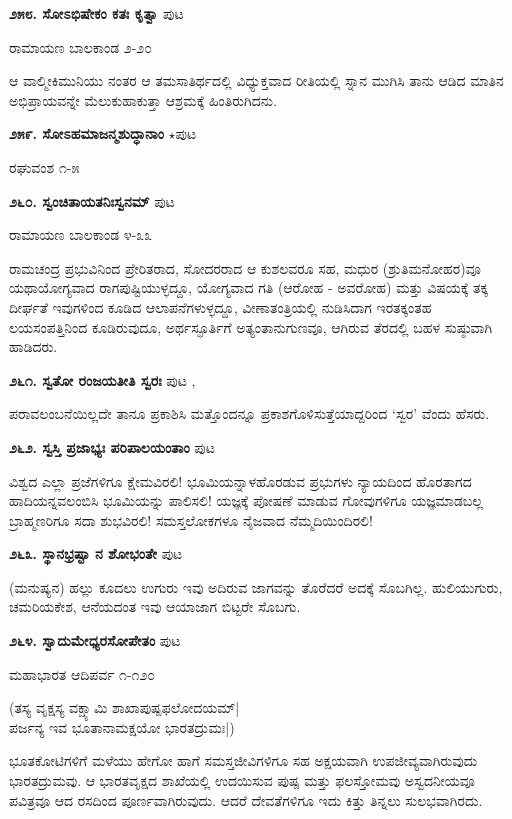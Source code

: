 {\medskip
\noindent\textbf{೨೫೮. ಸೋಽಭಿಷೇಕಂ ಕತಃ ಕೃತ್ವಾ} \hfill ಪುಟ \pageref{201}

\hfill ರಾಮಾಯಣ ಬಾಲಕಾಂಡ ೨-೨೦

ಆ ವಾಲ್ಮೀಕಿಮುನಿಯು ನಂತರ ಆ ತಮಸಾತಿರ್ಥದಲ್ಲಿ ವಿಧ್ಯುಕ್ತವಾದ ರೀತಿಯಲ್ಲಿ ಸ್ನಾನ ಮುಗಿಸಿ ತಾನು ಆಡಿದ ಮಾತಿನ ಅಭಿಪ್ರಾಯವನ್ನೇ ಮೆಲುಕುಹಾಕುತ್ತಾ ಆಶ್ರಮಕ್ಕೆ ಹಿಂತಿರುಗಿದನು.

\medskip
\noindent\textbf{೨೫೯. ಸೋಽಹಮಾಜನ್ಮಶುದ್ಧಾನಾಂ} $\star$\hfill ಪುಟ \pageref{148}

\hfill ರಘುವಂಶ ೧-೫

\medskip
\noindent\textbf{೨೬೦. ಸ್ವಂಚಿತಾಯತನಿಃಸ್ವನಮ್} \hfill ಪುಟ \pageref{250}

\hfill ರಾಮಾಯಣ ಬಾಲಕಾಂಡ ೪-೩೩

ರಾಮಚಂದ್ರ ಪ್ರಭುವಿನಿಂದ ಪ್ರೇರಿತರಾದ, ಸೋದರರಾದ ಆ ಕುಶಲವರೂ ಸಹ, ಮಧುರ (ಶ್ರುತಿಮನೋಹರ)ವೂ ಯಥಾಯೋಗ್ಯವಾದ ರಾಗಪುಷ್ಟಿಯುಳ್ಳದ್ದೂ, ಯೋಗ್ಯವಾದ ಗತಿ (ಆರೋಹ - ಅವರೋಹ) ಮತ್ತು ವಿಷಯಕ್ಕೆ ತಕ್ಕ ದೀರ್ಘತೆ ಇವುಗಳಿಂದ ಕೂಡಿದ ಆಲಾಪನೆಗಳುಳ್ಳದ್ದೂ, ವೀಣಾತಂತ್ರಿಯಲ್ಲಿ ನುಡಿಸಿದಾಗ ಇರತಕ್ಕಂತಹ ಲಯಸಂಪತ್ತಿನಿಂದ ಕೂಡಿರುವುದೂ, ಅರ್ಥಸ್ಫೂರ್ತಿಗೆ ಅತ್ಯಂತಾನುಗುಣವೂ, ಆಗಿರುವ ತೆರದಲ್ಲಿ ಬಹಳ ಸುಷ್ಠುವಾಗಿ ಹಾಡಿದರು.

\medskip
\noindent\textbf{೨೬೧. ಸ್ವತೋ ರಂಜಯತೀತಿ ಸ್ವರಃ} \hfill ಪುಟ \pageref{11},\pageref{17}

\hfill ಪರಾವಲಂಬನೆಯಿಲ್ಲದೇ ತಾನೂ ಪ್ರಕಾಶಿಸಿ ಮತ್ತೊಂದನ್ನೂ ಪ್ರಕಾಶಗೊಳಿಸುತ್ತೆಯಾದ್ದರಿಂದ `ಸ್ವರ' ವೆಂದು ಹೆಸರು.

\medskip
\noindent\textbf{೨೬೨. ಸ್ವಸ್ತಿ ಪ್ರಜಾಭ್ಯಃ ಪರಿಪಾಲಯಂತಾಂ} \hfill ಪುಟ \pageref{149}

\hfill ವಿಶ್ವದ ಎಲ್ಲಾ ಪ್ರಜೆಗಳಿಗೂ ಕ್ಷೇಮವಿರಲಿ! ಭೂಮಿಯನ್ನಾಳಹೊರಡುವ ಪ್ರಭುಗಳು ನ್ಯಾಯದಿಂದ ಹೊರತಾಗದ ಹಾದಿಯನ್ನವಲಂಬಿಸಿ ಭೂಮಿಯನ್ನು ಪಾಲಿಸಲಿ! ಯಜ್ಞಕ್ಕೆ ಪೋಷಣೆ ಮಾಡುವ ಗೋವುಗಳಿಗೂ ಯಜ್ಞಮಾಡಬಲ್ಲ ಬ್ರಾಹ್ಮಣರಿಗೂ ಸದಾ ಶುಭವಿರಲಿ! ಸಮಸ್ತಲೋಕಗಳೂ ನೈಜವಾದ ನೆಮ್ಮದಿಯಿಂದಿರಲಿ!

\medskip
\noindent\textbf{೨೬೩. ಸ್ಥಾನಭ್ರಷ್ಟಾ ನ ಶೋಭಂತೇ} \hfill ಪುಟ \pageref{48}

\hfill (ಮನುಷ್ಯನ) ಹಲ್ಲು ಕೂದಲು ಉಗುರು ಇವು ಅದಿರುವ ಜಾಗವನ್ನು ತೊರೆದರೆ ಅದಕ್ಕೆ ಸೊಬಗಿಲ್ಲ. ಹುಲಿಯುಗುರು, ಚಮರಿಯಕೇಶ, ಆನೆಯದಂತ ಇವು ಆಯಾಜಾಗ ಬಿಟ್ಟರೇ ಸೊಬಗು.

\medskip
\noindent\textbf{೨೬೪. ಸ್ವಾದುಮೇಧ್ಯರಸೋಪೇತಂ} \hfill ಪುಟ \pageref{119}

\hfill ಮಹಾಭಾರತ ಆದಿಪರ್ವ ೧-೧೨೦

\begin{shloka}
(ತಸ್ಯ ವೃಕ್ಷಸ್ಯ ವಕ್ಷ್ಯಾಮಿ ಶಾಖಾಪುಷ್ಪಫಲೋದಯಮ್|\\
ಪರ್ಜನ್ಯ ಇವ ಭೂತಾನಾಮಕ್ಷಯೋ ಭಾರತದ್ರುಮಃ|)
\end{shloka}

ಭೂತಕೋಟಿಗಳಿಗೆ ಮಳೆಯು ಹೇಗೋ ಹಾಗೆ ಸಮಸ್ತಜೀವಿಗಳಿಗೂ ಸಹ ಅಕ್ಷಯವಾಗಿ ಉಪಜೀವ್ಯವಾಗಿರುವುದು ಭಾರತದ್ರುಮವು. ಆ ಭಾರತವೃಕ್ಷದ ಶಾಖೆಯಲ್ಲಿ ಉದಯಿಸುವ ಪುಷ್ಪ ಮತ್ತು ಫಲಸ್ತೋಮವು ಅಸ್ವದನೀಯವೂ ಪವಿತ್ರವೂ ಆದ ರಸದಿಂದ ಪೂರ್ಣವಾಗಿರುವುದು. ಆದರೆ ದೇವತೆಗಳಿಗೂ ಇದು ಕಿತ್ತು ತಿನ್ನಲು ಸುಲಭವಾಗಿರದು.

}
